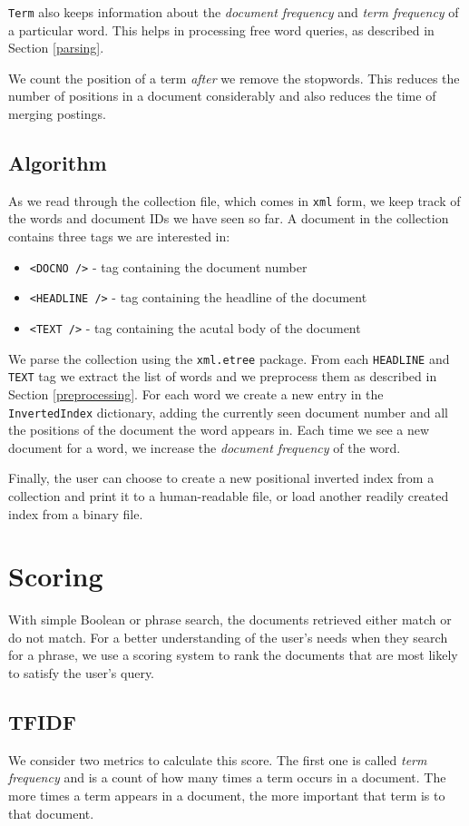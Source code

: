 \documentclass[11pt]{article}
\begin{document}
\begin{multicols}{2}
\verb!Term! also keeps information about the \textit{document frequency} and \textit{term frequency} of a particular word. This helps in processing free word queries, as described in Section \ref{parsing}.

We count the position of a term \textit{after} we remove the stopwords. This reduces the number of positions in a document considerably and also reduces the time of merging postings.


\subsection{Algorithm} \label{algorithm}
As we read through the collection file, which comes in \verb!xml! form, we keep track of the words and document IDs we have seen so far. A document in the collection contains three tags we are interested in:
\begin{itemize}
	\item \verb!<DOCNO />! - tag containing the document number
	\item \verb!<HEADLINE />! - tag containing the headline of the document
	\item \verb!<TEXT />! - tag containing the acutal body of the document
\end{itemize}
We parse the collection using the \verb!xml.etree! package. From each \verb!HEADLINE! and \verb!TEXT! tag we extract the list of words and we preprocess them as described in Section \ref{preprocessing}. For each word we create a new entry in the \verb!InvertedIndex! dictionary, adding the currently seen document number and all the positions of the document the word appears in. Each time we see a new document for a word, we increase the \textit{document frequency} of the word.

Finally, the user can choose to create a new positional inverted index from a collection and print it to a human-readable file, or load another readily created index from a binary file.

\section{Scoring} \label{scoring}
With simple Boolean or phrase search, the documents retrieved either match or do not match. For a better understanding of the user's needs when they search for a phrase, we use a scoring system to rank the documents that are most likely to satisfy the user's query. 

\subsection{TFIDF}
We consider two metrics to calculate this score. The first one is called \textit{term frequency} and is a count of how many times a term occurs in a document. The more times a term appears in a document, the more important that term is to that document. 


\end{multicols}
\end{document}
